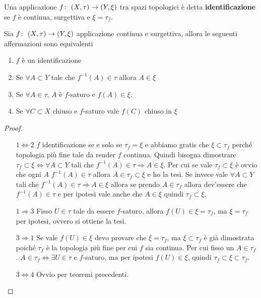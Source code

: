 \begin{definition}
	Una applicazione $f \colon\ (X,\tau) \rightarrow (Y, \xi)$ tra spazi topologici è detta \textbf{identificazione} se $f$ è continua, surgettiva e $\xi = \tau_f$.
\end{definition}

\begin{theorem}
	\label{crtident}
	Sia $f \colon\ (X,\tau) \rightarrow (Y, \xi)$ applicazione continua e surgettiva, allora le seguenti affermazioni sono equivalenti
	\begin{enumerate}
		\item $f$ è un identificazione
		\item Se $\forall A \subset Y$  tale che $f^{-1}(A) \in \tau$ allora $A \in \xi$
		\item Se $\forall A \in \tau$, $A$ è $f$-saturo e $f(A) \in \xi$.
		\item Se $\forall C \subset X$ chiuso e $f$-saturo vale $f(C)$ chiuso in $\xi$
	\end{enumerate}
\end{theorem}
\begin{proof}
	\begin{enumerate}
		\item[$1 \Leftrightarrow 2$] $f$ identificazione se e solo se $\tau_f = \xi$ e abbiamo gratis che $\xi \subset \tau_f$ perché topologia più fine tale da render $f$ continua. Quindi bisogna dimostrare $\tau_f \subset \xi \Longleftrightarrow \forall A \subset Y$ tali che $f^{-1}(A) \in \tau \Rightarrow A \in \xi$. Per cui se vale $\tau_f \subset \xi$ è ovvio che ogni $A$ $f^{-1}(A) \in \tau$ allora $A \in \tau_f \subset \xi$ e ho la tesi. Se invece vale $\forall A \subset Y$ tali che $f^{-1}(A) \in \tau \Rightarrow A \in \xi$ allora se prendo $A \in \tau_f$ allora dev'essere che $f^{-1}(A) \in \tau$ e per ipotesi vale anche che $A \in \xi$ quindi $\tau_f \subset \xi$. 
		\item[$1 \Rightarrow 3$] Fisso $U \in \tau$ tale da essere $f$-saturo, allora $f(U) \in \xi = \tau_f$, ma $\xi = \tau_f$ per ipotesi, ovvero si ottiene la tesi.
		\item[$3 \Rightarrow 1$] Se vale $f(U) \in \xi$ devo provare che $\xi = \tau_f$, ma $\xi \subset \tau_f$ è già dimostrata poiché $\tau_f$ è la topologia più fine per cui $f$ sia continua. Per cui fisso un $A \in \tau_f$. $A \in \tau_f \Leftrightarrow \exists U \in \tau$ e $f$-saturo, ma per ipotesi $f(U) \in \xi$, quindi $\tau_f \subset \xi \subset \tau_f$.
		\item[$3\Leftrightarrow 4$] Ovvio per teoremi precedenti.
	\end{enumerate}
\end{proof}



